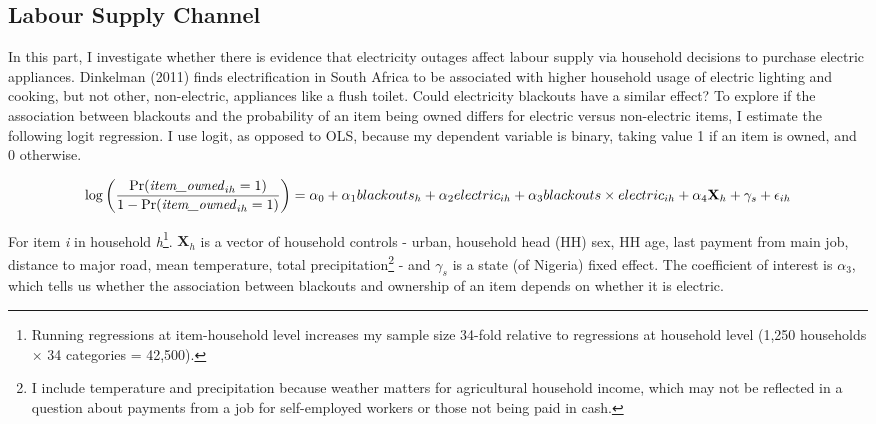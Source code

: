 \documentclass[12pt]{article}
\begin{document}
\subsection{Labour Supply Channel} \label{subsec:lsmethod}
In this part, I investigate whether there is evidence that electricity outages affect labour supply via household decisions to purchase electric appliances. Dinkelman (2011) \cite{dinkelman2011a} finds electrification in South Africa to be associated with higher household usage of electric lighting and cooking, but not other, non-electric, appliances like a flush toilet. Could electricity blackouts have a similar effect? To explore if the association between blackouts and the probability of an item being owned differs for electric versus non-electric items, I estimate the following logit regression. I use logit, as opposed to OLS, because my dependent variable is binary, taking value 1 if an item is owned, and 0 otherwise. 
\begin{adjustwidth}{-0.4in}{-0.4in}
\small
\begin{equation} \label{eq:eq1}
\log\left(\frac{\Pr(\text{\textit{item\_owned}}_{ih} = 1)}{1 - \Pr(\text{\textit{item\_owned}}_{ih} = 1)}\right) = \alpha_0 + \alpha_1 blackouts_{h} + \alpha_2 electric_{ih} + \alpha_3 blackouts \times electric_{ih} + \alpha_4 \textbf{X}_{h} + \gamma_{s} + \epsilon_{ih}
\end{equation}
\normalsize
\end{adjustwidth}
\par
For item \textit{i} in household \textit{h}\footnote{Running regressions at item-household level increases my sample size 34-fold relative to regressions at household level (1,250 households $\times$ 34 categories = 42,500).}. $\textbf{X}_{h}$ is a vector of household controls - urban, household head (HH) sex, HH age, last payment from main job, distance to major road, mean temperature, total precipitation\footnote{I include temperature and precipitation because weather matters for agricultural household income, which may not be reflected in a question about payments from a job for self-employed workers or those not being paid in cash.} - and $\gamma_{s}$ is a state (of Nigeria) fixed effect. The coefficient of interest is $\alpha_{3}$, which tells us whether the association between blackouts and ownership of an item depends on whether it is electric. 
\end{document}
